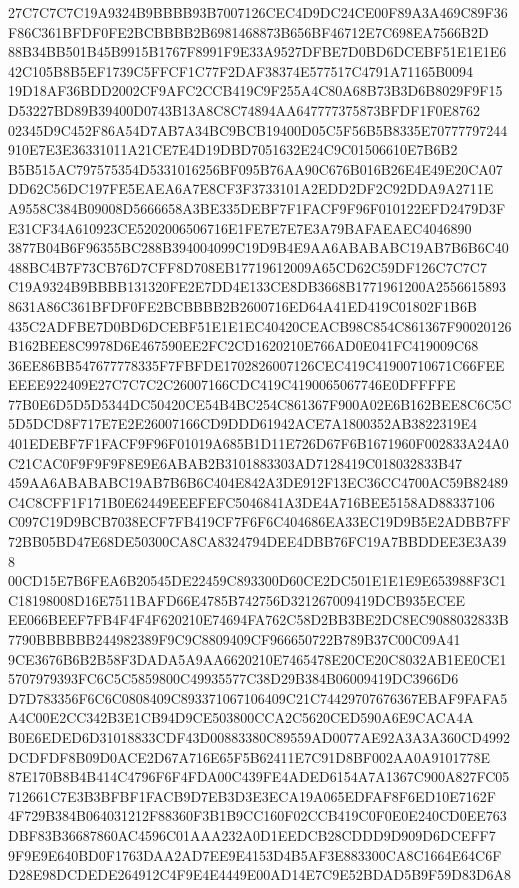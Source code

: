 \documentclass[UTF8,fontset=fandol,zihao=-4,a4paper]{ctexart}
\begin{document}
{{27C7C7C7C19A9324B9BBBB93B7007126CEC4D9DC24CE00F89A3A469C89F36F86C361BFDF0FE2BCBBBB2B6981468873B656BF46712E7C698EA7566B2D
88B34BB501B45B9915B1767F8991F9E33A9527DFBE7D0BD6DCEBF51E1E1E642C105B8B5EF1739C5FFCF1C77F2DAF38374E577517C4791A71165B0094
19D18AF36BDD2002CF9AFC2CCB419C9F255A4C80A68B73B3D6B8029F9F15D53227BD89B39400D0743B13A8C8C74894AA647777375873BFDF1F0E8762
02345D9C452F86A54D7AB7A34BC9BCB19400D05C5F56B5B8335E70777797244910E7E3E36331011A21CE7E4D19DBD7051632E24C9C01506610E7B6B2
B5B515AC797575354D5331016256BF095B76AA90C676B016B26E4E49E20CA07DD62C56DC197FE5EAEA6A7E8CF3F3733101A2EDD2DF2C92DDA9A2711E
A9558C384B09008D5666658A3BE335DEBF7F1FACF9F96F010122EFD2479D3FE31CF34A610923CE5202006506716E1FE7E7E7E3A79BAFAEAEC4046890
3877B04B6F96355BC288B394004099C19D9B4E9AA6ABABABC19AB7B6B6C40488BC4B7F73CB76D7CFF8D708EB17719612009A65CD62C59DF126C7C7C7
C19A9324B9BBBB131320FE2E7DD4E133CE8DB3668B1771961200A25566158938631A86C361BFDF0FE2BCBBBB2B2600716ED64A41ED419C01802F1B6B
435C2ADFBE7D0BD6DCEBF51E1E1EC40420CEACB98C854C861367F90020126B162BEE8C9978D6E467590EE2FC2CD1620210E766AD0E041FC419009C68
36EE86BB547677778335F7FBFDE1702826007126CEC419C41900710671C66FEEEEEE922409E27C7C7C2C26007166CDC419C4190065067746E0DFFFFE
77B0E6D5D5D5344DC50420CE54B4BC254C861367F900A02E6B162BEE8C6C5C5D5DCD8F717E7E2E26007166CD9DDD61942ACE7A1800352AB3822319E4
401EDEBF7F1FACF9F96F01019A685B1D11E726D67F6B1671960F002833A24A0C21CAC0F9F9F9F8E9E6ABAB2B3101883303AD7128419C018032833B47
459AA6ABABABC19AB7B6B6C404E842A3DE912F13EC36CC4700AC59B82489C4C8CFF1F171B0E62449EEEFEFC5046841A3DE4A716BEE5158AD88337106
C097C19D9BCB7038ECF7FB419CF7F6F6C404686EA33EC19D9B5E2ADBB7FF72BB05BD47E68DE50300CA8CA8324794DEE4DBB76FC19A7BBDDEE3E3A398
00CD15E7B6FEA6B20545DE22459C893300D60CE2DC501E1E1E9E653988F3C1C18198008D16E7511BAFD66E4785B742756D321267009419DCB935ECEE
EE066BEEF7FB4F4F4F620210E74694FA762C58D2BB3BE2DC8EC9088032833B7790BBBBBB244982389F9C9C8809409CF966650722B789B37C00C09A41
9CE3676B6B2B58F3DADA5A9AA6620210E7465478E20CE20C8032AB1EE0CE15707979393FC6C5C5859800C49935577C38D29B384B06009419DC3966D6
D7D783356F6C6C0808409C893371067106409C21C74429707676367EBAF9FAFA5A4C00E2CC342B3E1CB94D9CE503800CCA2C5620CED590A6E9CACA4A
B0E6EDED6D31018833CDF43D00883380C89559AD0077AE92A3A3A360CD4992DCDFDF8B09D0ACE2D67A716E65F5B62411E7C91D8BF002AA0A9101778E
87E170B8B4B414C4796F6F4FDA00C439FE4ADED6154A7A1367C900A827FC05712661C7E3B3BFBF1FACB9D7EB3D3E3ECA19A065EDFAF8F6ED10E7162F
4F729B384B064031212F88360F3B1B9CC160F02CCB419C0F0E0E240CD0EE763DBF83B36687860AC4596C01AAA232A0D1EEDCB28CDDD9D909D6DCEFF7
9F9E9E640BD0F1763DAA2AD7EE9E4153D4B5AF3E883300CA8C1664E64C6FD28E98DCDEDE264912C4F9E4E4449E00AD14E7C9E52BDAD5B9F59D83D6A8
}}
\end{document}
